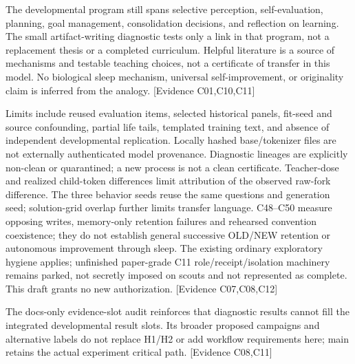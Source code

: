 \documentclass[11pt]{article}
\newcommand{\ev}[1]{\textsf{[Evidence #1]}}
\begin{document}
The developmental program still spans selective perception, self-evaluation,
planning, goal management, consolidation decisions, and reflection on learning.
The small artifact-writing diagnostic tests only a link in that program, not a
replacement thesis or a completed curriculum. Helpful literature is a source of
mechanisms and testable teaching choices, not a certificate of transfer in this
model. No biological sleep mechanism, universal self-improvement, or originality
claim is inferred from the analogy. \ev{C01,C10,C11}

Limits include reused evaluation items, selected historical panels, fit-seed and
source confounding, partial life tails, templated training text, and absence of
independent developmental replication. Locally hashed base/tokenizer files are
not externally authenticated model provenance. Diagnostic lineages are explicitly
non-clean or quarantined; a new process is not a clean certificate. Teacher-dose
and realized child-token differences limit attribution of the observed raw-fork
difference. The three behavior seeds reuse the same questions and generation
seed; solution-grid overlap further limits transfer language. C48--C50 measure opposing writes, memory-only retention failures and rehearsed
convention coexistence; they do not establish general successive OLD/NEW
retention or autonomous improvement through sleep.
The existing ordinary exploratory hygiene applies; unfinished paper-grade C11
role/receipt/isolation machinery remains parked, not secretly imposed on scouts
and not represented as complete. This draft grants no new authorization. \ev{C07,C08,C12}

The docs-only evidence-slot audit reinforces that diagnostic results cannot fill
the integrated developmental result slots. Its broader proposed campaigns and
alternative labels do not replace H1/H2 or add workflow requirements here; main
retains the actual experiment critical path. \ev{C08,C11}
\end{document}
